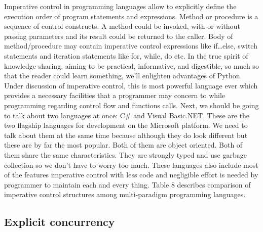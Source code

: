 \documentclass{sig-alternate}
\begin{document}
Imperative control in programming languages allow to explicitly define the execution order of program statements and expressions. Method or procedure is a sequence of control constructs. A method could be invoked, with or without passing parameters and its result could be returned to the caller. Body of method/procedure may contain imperative control expressions like if…else, switch statements and iteration statements like for, while, do etc.
\newline
In the true spirit of knowledge sharing, aiming to be practical, informative, and digestible, so much so that the reader could learn something, we’ll enlighten advantages of Python. Under discussion of imperative control, this is most powerful language ever which provides a necessary facilities that a programmer may concern to while programming regarding control flow and functions calls. Next, we should be going to talk about two languages at once: C# and Visual Basic.NET. These are the two flagship languages for development on the Microsoft platform. We need to talk about them at the same time because although they do look different but these are by far the most popular. Both of them are object oriented. Both of them share the same characteristics. They are strongly typed and use garbage collection so we don't have to worry too much. These languages also include most of the features imperative control with less code and negligible effort is needed by programmer to maintain each and every thing. Table 8 describes comparison of imperative control structures among multi-paradigm programming languages. 


\subsection{Explicit concurrency}
\end{document}
